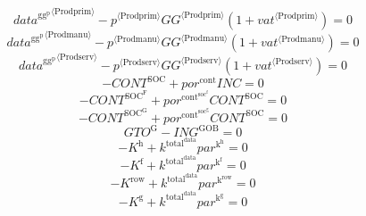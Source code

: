 \begin{equation}
{{d\!a\!t\!a}^{\mathrm{gg}^{\mathrm{p}}}}^{\langle \mathrm{\mathrm{Prodprim}}\rangle} - {{p}^{\langle \mathrm{Prodprim}\rangle}} {{{G\!G}}^{\langle \mathrm{Prodprim}\rangle}} \left(1 + {{v\!a\!t}}^{\langle \mathrm{\mathrm{Prodprim}}\rangle}\right) = 0
\end{equation}
\begin{equation}
{{d\!a\!t\!a}^{\mathrm{gg}^{\mathrm{p}}}}^{\langle \mathrm{\mathrm{Prodmanu}}\rangle} - {{p}^{\langle \mathrm{Prodmanu}\rangle}} {{{G\!G}}^{\langle \mathrm{Prodmanu}\rangle}} \left(1 + {{v\!a\!t}}^{\langle \mathrm{\mathrm{Prodmanu}}\rangle}\right) = 0
\end{equation}
\begin{equation}
{{d\!a\!t\!a}^{\mathrm{gg}^{\mathrm{p}}}}^{\langle \mathrm{\mathrm{Prodserv}}\rangle} - {{p}^{\langle \mathrm{Prodserv}\rangle}} {{{G\!G}}^{\langle \mathrm{Prodserv}\rangle}} \left(1 + {{v\!a\!t}}^{\langle \mathrm{\mathrm{Prodserv}}\rangle}\right) = 0
\end{equation}
\begin{equation}
-{C\!O\!N\!T}^{\mathrm{SOC}} + {{p\!o\!r}^{\mathrm{cont}}} {{I\!N\!C}} = 0
\end{equation}
\begin{equation}
-{C\!O\!N\!T}^{\mathrm{SOC}^{\mathrm{F}}} + {{p\!o\!r}^{\mathrm{cont}^{\mathrm{soc}^{\mathrm{f}}}}} {{C\!O\!N\!T}^{\mathrm{SOC}}} = 0
\end{equation}
\begin{equation}
-{C\!O\!N\!T}^{\mathrm{SOC}^{\mathrm{G}}} + {{p\!o\!r}^{\mathrm{cont}^{\mathrm{soc}^{\mathrm{g}}}}} {{C\!O\!N\!T}^{\mathrm{SOC}}} = 0
\end{equation}
\begin{equation}
{G\!T\!O}^{\mathrm{G}} - {I\!N\!G}^{\mathrm{GOB}} = 0
\end{equation}
\begin{equation}
-K^{\mathrm{h}} + {k^{\mathrm{total}^{\mathrm{data}}}} {{p\!a\!r}^{\mathrm{k}^{\mathrm{h}}}} = 0
\end{equation}
\begin{equation}
-K^{\mathrm{f}} + {k^{\mathrm{total}^{\mathrm{data}}}} {{p\!a\!r}^{\mathrm{k}^{\mathrm{f}}}} = 0
\end{equation}
\begin{equation}
-K^{\mathrm{row}} + {k^{\mathrm{total}^{\mathrm{data}}}} {{p\!a\!r}^{\mathrm{k}^{\mathrm{row}}}} = 0
\end{equation}
\begin{equation}
-K^{\mathrm{g}} + {k^{\mathrm{total}^{\mathrm{data}}}} {{p\!a\!r}^{\mathrm{k}^{\mathrm{g}}}} = 0
\end{equation}
